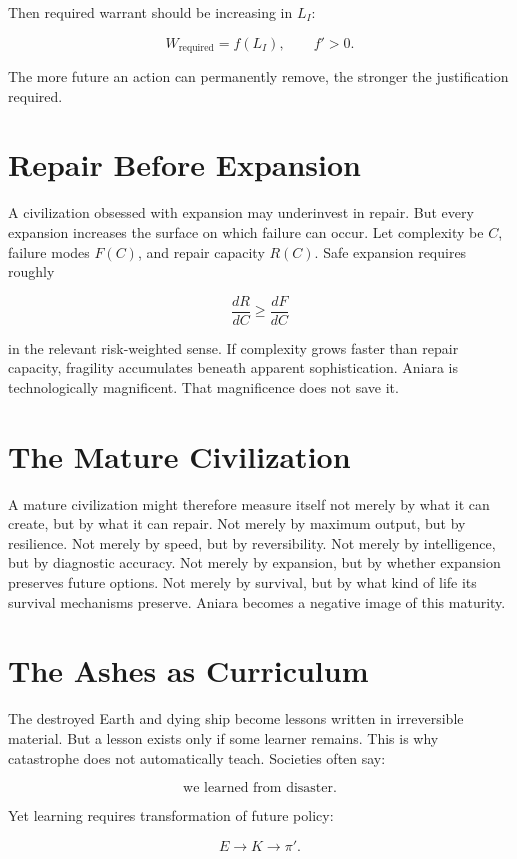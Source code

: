 \documentclass[11pt,oneside]{book}
\theoremstyle{definition}
\theoremstyle{remark}
\begin{document}
Then required warrant should be increasing in \(L_I\):

\[
W_{\mathrm{required}} = f(L_I), \qquad f'>0.
\]

The more future an action can permanently remove, the stronger the justification required.

\section{Repair Before Expansion}

A civilization obsessed with expansion may underinvest in repair. But every expansion increases the
surface on which failure can occur. Let complexity be \(C\), failure modes \(F(C)\), and repair
capacity \(R(C)\). Safe expansion requires roughly

\[
\frac{dR}{dC} \geq \frac{dF}{dC}
\]

in the relevant risk-weighted sense. If complexity grows faster than repair capacity, fragility
accumulates beneath apparent sophistication. Aniara is technologically magnificent. That
magnificence does not save it.

\section{The Mature Civilization}

A mature civilization might therefore measure itself not merely by what it can create, but by what
it can repair. Not merely by maximum output, but by resilience. Not merely by speed, but by
reversibility. Not merely by intelligence, but by diagnostic accuracy. Not merely by expansion, but
by whether expansion preserves future options. Not merely by survival, but by what kind of life its
survival mechanisms preserve. Aniara becomes a negative image of this maturity.

\section{The Ashes as Curriculum}

The destroyed Earth and dying ship become lessons written in irreversible material. But a lesson
exists only if some learner remains. This is why catastrophe does not automatically teach. Societies
often say:

\[
\text{we learned from disaster}.
\]

Yet learning requires transformation of future policy:

\[
E \rightarrow K \rightarrow \pi'.
\]
\end{document}
